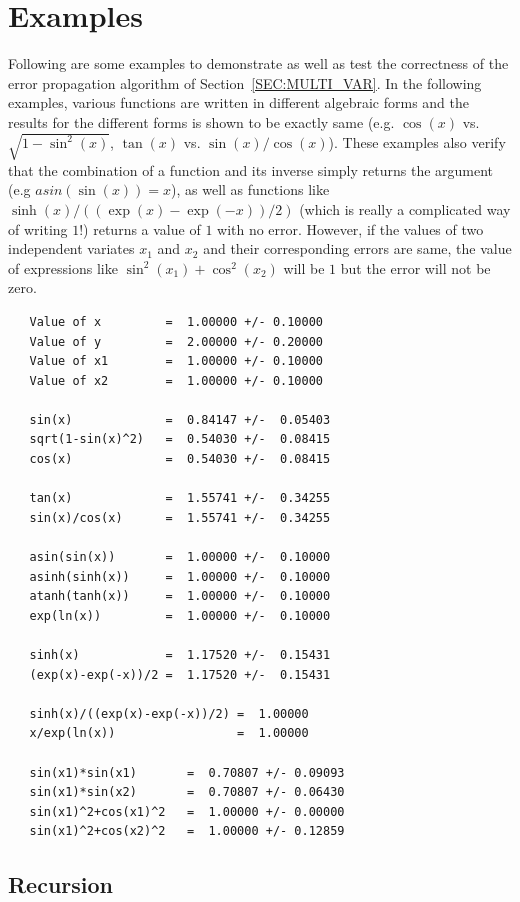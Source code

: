 \documentclass[12pt]{article}
\begin{document}
\section{Examples}
\label{SEC:EXAMPLES}
Following are some examples to demonstrate as well as test the
correctness of the error propagation algorithm of
Section~\ref{SEC:MULTI_VAR}.  In the following examples, various
functions are written in different algebraic forms and the results for
the different forms is shown to be exactly same (e.g. $\cos(x)$ vs.
$\sqrt{1-\sin^2(x)}$, $\tan(x)$ vs. $\sin(x)/\cos(x)$).  These
examples also verify that the combination of a function and its
inverse simply returns the argument (e.g $asin(\sin(x))=x$), as well
as functions like $\sinh(x)/((\exp(x)-\exp(-x))/2)$ (which is really a
complicated way of writing $1$!) returns a value of $1$ with no error.
However, if the values of two independent variates $x_1$ and $x_2$ and
their corresponding errors are same, the value of expressions like
$\sin^2(x_1) + \cos^2(x_2)$ will be $1$ but the error will not be zero.
\begin{verbatim}
   Value of x         =  1.00000 +/- 0.10000
   Value of y         =  2.00000 +/- 0.20000
   Value of x1        =  1.00000 +/- 0.10000
   Value of x2        =  1.00000 +/- 0.10000

   sin(x)             =  0.84147 +/-  0.05403
   sqrt(1-sin(x)^2)   =  0.54030 +/-  0.08415
   cos(x)             =  0.54030 +/-  0.08415

   tan(x)             =  1.55741 +/-  0.34255
   sin(x)/cos(x)      =  1.55741 +/-  0.34255

   asin(sin(x))       =  1.00000 +/-  0.10000
   asinh(sinh(x))     =  1.00000 +/-  0.10000
   atanh(tanh(x))     =  1.00000 +/-  0.10000
   exp(ln(x))         =  1.00000 +/-  0.10000

   sinh(x)            =  1.17520 +/-  0.15431
   (exp(x)-exp(-x))/2 =  1.17520 +/-  0.15431

   sinh(x)/((exp(x)-exp(-x))/2) =  1.00000
   x/exp(ln(x))                 =  1.00000

   sin(x1)*sin(x1)       =  0.70807 +/- 0.09093
   sin(x1)*sin(x2)       =  0.70807 +/- 0.06430
   sin(x1)^2+cos(x1)^2   =  1.00000 +/- 0.00000
   sin(x1)^2+cos(x2)^2   =  1.00000 +/- 0.12859
\end{verbatim}

\subsection{Recursion}
\end{document}

